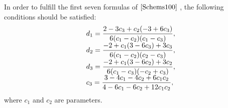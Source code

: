 \documentclass{article}
\begin{document}
In order to fulfill  the first seven formulas of $\eqref{Schems100}$
, the following conditions should be satisfied:
\begin{equation}
\begin{array}
[c]{ll}
d_{1}=\dfrac{2-3c_{3}+c_{2}(-3+6c_{3})}{6(c_{1}-c_{2})(c_{1}-c_{3})},\\
d_{2}=\dfrac{-2+c_{1}(3-6c_{3})+3c_{3}}{6(c_{1}-c_{2})(c_{2}-c_{3})},\\
d_{3}=\dfrac{-2+c_{1}(3-6c_{2})+3c_{2}}{6(c_{1}-c_{3})(-c_{2}+c_{3})},\\
c_{3}=\dfrac{3-4c_{1}-4c_{2}+6c_{1}c_{2}}{4-6c_{1}-6c_{2}+12c_{1}c_{2}},\\
\end{array}
  \label{ekrnC}%
\end{equation}
where $c_{1} $ and $c_{2}$ are parameters.
\end{document}
